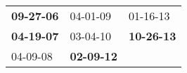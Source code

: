 \begin{supertabular}{p{0.33\columnwidth}p{0.33\columnwidth}p{0.33\columnwidth}}
 \textbf{09-27-06\textsuperscript{}} &           04-01-09\textsuperscript{} &           01-16-13\textsuperscript{} \\
 \textbf{04-19-07\textsuperscript{}} &           03-04-10\textsuperscript{} &  \textbf{10-26-13\textsuperscript{}} \\
          04-09-08\textsuperscript{} &  \textbf{02-09-12\textsuperscript{}} &                                      \\
\end{supertabular}
